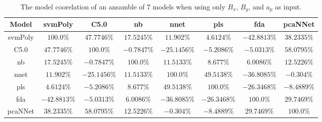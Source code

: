 \begin{table}[!ht]
	\centering
	\begin{tabular}{|c|c|c|c|c|c|c|c|}
		\hline
		Model & svmPoly & C5.0 & nb & nnet & pls & fda & pcaNNet \\ \hline
		svmPoly & $100.0\%$ & $47.7746\%$ & $17.5245\%$ & $11.902\%$ & $4.6124\%$ & $-42.8813\%$ & $38.2335\%$ \\ \hline
		C5.0 & $47.7746\%$ & $100.0\%$ & $-0.7847\%$ & $-25.1456\%$ & $-5.2086\%$ & $-5.0313\%$ & $58.0795\%$ \\ \hline
		nb & $17.5245\%$ & $-0.7847\%$ & $100.0\%$ & $11.5133\%$ & $8.677\%$ & $6.0086\%$ & $12.5226\%$ \\ \hline
		nnet & $11.902\%$ & $-25.1456\%$ & $11.5133\%$ & $100.0\%$ & $49.5138\%$ & $-36.8085\%$ & $-0.304\%$ \\ \hline
		pls & $4.6124\%$ & $-5.2086\%$ & $8.677\%$ & $49.5138\%$ & $100.0\%$ & $-26.3468\%$ & $-8.4889\%$ \\ \hline
		fda & $-42.8813\%$ & $-5.0313\%$ & $6.0086\%$ & $-36.8085\%$ & $-26.3468\%$ & $100.0\%$ & $29.7469\%$ \\ \hline
		pcaNNet & $38.2335\%$ & $58.0795\%$ & $12.5226\%$ & $-0.304\%$ & $-8.4889\%$ & $29.7469\%$ & $100.0\%$ \\ \hline
	\end{tabular}
	\caption{The model coorelation of an ansamble of 7 models when using only $B_{x}$, $B_{y}$, and $a_{p}$ as input.}
	\label{tab:ansamble7:xyap}
\end{table}
